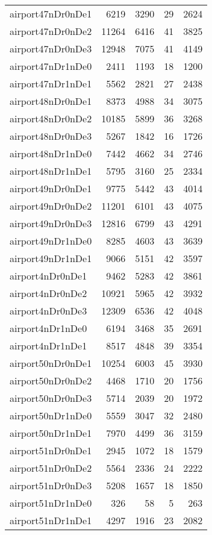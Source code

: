 \begin{longtable}{lrrrr}
airport47nDr0nDe1 & 6219 & 3290 & 29 & 2624 \\
airport47nDr0nDe2 & 11264 & 6416 & 41 & 3825 \\
airport47nDr0nDe3 & 12948 & 7075 & 41 & 4149 \\
airport47nDr1nDe0 & 2411 & 1193 & 18 & 1200 \\
airport47nDr1nDe1 & 5562 & 2821 & 27 & 2438 \\
airport48nDr0nDe1 & 8373 & 4988 & 34 & 3075 \\
airport48nDr0nDe2 & 10185 & 5899 & 36 & 3268 \\
airport48nDr0nDe3 & 5267 & 1842 & 16 & 1726 \\
airport48nDr1nDe0 & 7442 & 4662 & 34 & 2746 \\
airport48nDr1nDe1 & 5795 & 3160 & 25 & 2334 \\
airport49nDr0nDe1 & 9775 & 5442 & 43 & 4014 \\
airport49nDr0nDe2 & 11201 & 6101 & 43 & 4075 \\
airport49nDr0nDe3 & 12816 & 6799 & 43 & 4291 \\
airport49nDr1nDe0 & 8285 & 4603 & 43 & 3639 \\
airport49nDr1nDe1 & 9066 & 5151 & 42 & 3597 \\
airport4nDr0nDe1 & 9462 & 5283 & 42 & 3861 \\
airport4nDr0nDe2 & 10921 & 5965 & 42 & 3932 \\
airport4nDr0nDe3 & 12309 & 6536 & 42 & 4048 \\
airport4nDr1nDe0 & 6194 & 3468 & 35 & 2691 \\
airport4nDr1nDe1 & 8517 & 4848 & 39 & 3354 \\
airport50nDr0nDe1 & 10254 & 6003 & 45 & 3930 \\
airport50nDr0nDe2 & 4468 & 1710 & 20 & 1756 \\
airport50nDr0nDe3 & 5714 & 2039 & 20 & 1972 \\
airport50nDr1nDe0 & 5559 & 3047 & 32 & 2480 \\
airport50nDr1nDe1 & 7970 & 4499 & 36 & 3159 \\
airport51nDr0nDe1 & 2945 & 1072 & 18 & 1579 \\
airport51nDr0nDe2 & 5564 & 2336 & 24 & 2222 \\
airport51nDr0nDe3 & 5208 & 1657 & 18 & 1850 \\
airport51nDr1nDe0 & 326 & 58 & 5 & 263 \\
airport51nDr1nDe1 & 4297 & 1916 & 23 & 2082 \\

\end{longtable}
